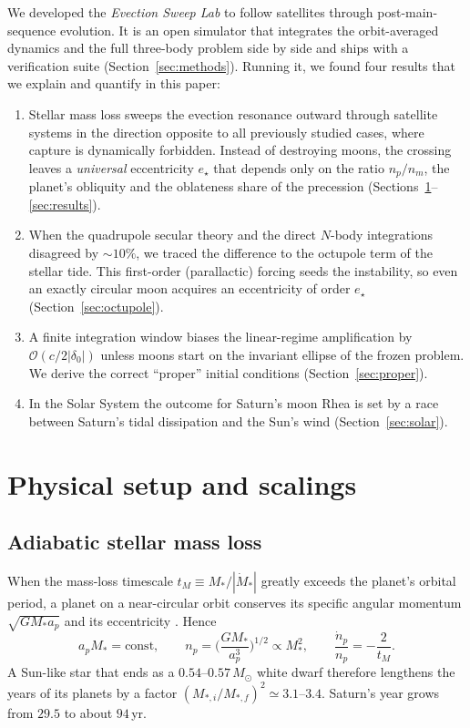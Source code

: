 \documentclass[11pt,a4paper]{article}
\newcommand{\estar}{e_\star}
\newcommand{\msun}{M_\odot}
\begin{document}
We developed the \emph{Evection Sweep Lab} to follow satellites through post-main-sequence evolution. It is an open simulator that integrates the orbit-averaged dynamics and the full three-body problem side by side and ships with a verification suite (Section~\ref{sec:methods}). Running it, we found four results that we explain and quantify in this paper:
\begin{enumerate}
\item Stellar mass loss sweeps the evection resonance outward through satellite systems in the direction opposite to all previously studied cases, where capture is dynamically forbidden. Instead of destroying moons, the crossing leaves a \emph{universal} eccentricity $\estar$ that depends only on the ratio $n_p/n_m$, the planet's obliquity and the oblateness share of the precession (Sections~\ref{sec:setup}--\ref{sec:results}).
\item When the quadrupole secular theory and the direct $N$-body integrations disagreed by $\sim10\%$, we traced the difference to the octupole term of the stellar tide. This first-order (parallactic) forcing seeds the instability, so even an exactly circular moon acquires an eccentricity of order $\estar$ (Section~\ref{sec:octupole}).
\item A finite integration window biases the linear-regime amplification by $\mathcal O(c/2|\delta_0|)$ unless moons start on the invariant ellipse of the frozen problem. We derive the correct ``proper'' initial conditions (Section~\ref{sec:proper}).
\item In the Solar System the outcome for Saturn's moon Rhea is set by a race between Saturn's tidal dissipation and the Sun's wind (Section~\ref{sec:solar}).
\end{enumerate}

\section{Physical setup and scalings}\label{sec:setup}

\subsection{Adiabatic stellar mass loss}

When the mass-loss timescale $t_M\equiv M_\ast/|\dot M_\ast|$ greatly exceeds the planet's orbital period, a planet on a near-circular orbit conserves its specific angular momentum $\sqrt{GM_\ast a_p}$ and its eccentricity \citep{Hadjidemetriou1963,Veras2011}. Hence
\begin{equation}
a_p M_\ast=\text{const},\qquad n_p=\Big(\frac{GM_\ast}{a_p^3}\Big)^{1/2}\propto M_\ast^{2},\qquad \frac{\dot n_p}{n_p}=-\frac{2}{t_M}.
\label{eq:adiabatic}
\end{equation}
A Sun-like star that ends as a $0.54$--$0.57\,\msun$ white dwarf therefore lengthens the years of its planets by a factor $(M_{\ast,i}/M_{\ast,f})^{2}\simeq3.1$--$3.4$. Saturn's year grows from $29.5$ to about $94$\,yr.
\end{document}
